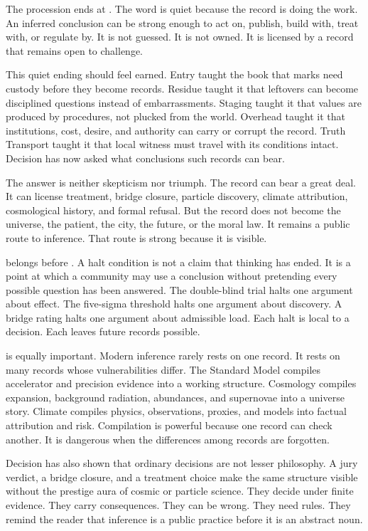 \begin{movementclose}
The procession ends at . The word is quiet because the record is
doing the work. An inferred conclusion can be strong enough to act on, publish,
build with, treat with, or regulate by. It is not guessed. It is not owned. It
is licensed by a record that remains open to challenge.

This quiet ending should feel earned. Entry taught the book that marks need
custody before they become records. Residue taught it that leftovers can
become disciplined questions instead of embarrassments. Staging taught it that
values are produced by procedures, not plucked from the world. Overhead taught
it that institutions, cost, desire, and authority can carry or corrupt the
record. Truth Transport taught it that local witness must travel with its
conditions intact. Decision has now asked what conclusions such records can
bear.

The answer is neither skepticism nor triumph. The record can bear a great
deal. It can license treatment, bridge closure, particle discovery, climate
attribution, cosmological history, and formal refusal. But the record does not
become the universe, the patient, the city, the future, or the moral law. It
remains a public route to inference. That route is strong because it is
visible.

 belongs before . A halt condition is not a claim
that thinking has ended. It is a point at which a community may
use a conclusion without pretending every possible question has been
answered. The double-blind trial halts one argument about effect. The
five-sigma threshold halts one argument about discovery. A bridge rating
halts one argument about admissible load. Each halt is local to a decision.
Each leaves future records possible.

 is equally important. Modern inference rarely rests on one
record. It rests on many records whose vulnerabilities differ. The Standard
Model compiles accelerator and precision evidence into a working structure.
Cosmology compiles expansion, background radiation, abundances, and
supernovae into a universe story. Climate compiles physics, observations,
proxies, and models into factual attribution and risk. Compilation is powerful
because one record can check another. It is dangerous when the differences
among records are forgotten.

Decision has also shown that ordinary decisions are not lesser
philosophy. A jury verdict, a bridge closure, and a treatment choice make the
same structure visible without the prestige aura of cosmic or particle
science. They decide under finite evidence. They carry consequences. They can
be wrong. They need rules. They remind the reader that inference is a public
practice before it is an abstract noun.


\end{movementclose}
